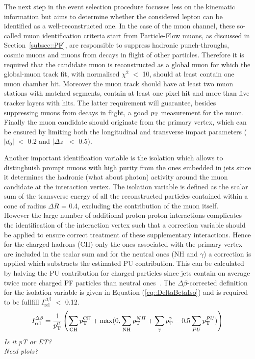 The next step in the event selection procedure focusses less on the kinematic information but aims to determine whether the considered lepton can be identified as a well-reconstructed one. 
In the case of the muon channel, these so-called muon identification criteria start from Particle-Flow muons, as discussed in Section~\ref{subsec::PF}, are responsible to suppress hadronic punch-throughs, cosmic muons and muons from decays in flight of other particles.
Therefore it is required that the candidate muon is reconstructed as a global muon for which the global-muon track fit, with normalised $\chi^{2}$ $<$ 10, should at least contain one muon chamber hit. 
Moreover the muon track should have at least two muon stations with matched segments, contain at least one pixel hit and more than five tracker layers with hits. The latter requirement will guarantee, besides suppressing muons from decays in flight, a good $p_{\rm T}$ measurement for the muon.
Finally the muon candidate should originate from the primary vertex, which can be ensured by limiting both the longitudinal and transverse impact parameters ($\vert d_0 \vert$ $<$ 0.2 and $\vert \Delta z \vert$ $<$ 0.5).

Another important identification variable is the isolation which allows to distinghuish prompt muons with high purity from the ones embedded in jets since it determines the hadronic (what about photon) activity around the muon candidate at the interaction vertex. %
The isolation variable is defined as the scalar sum of the transverse energy of all the reconstructed particles contained within a cone of radius $\Delta R$ = 0.4, excluding the contribution of the muon itself.
\\
However the large number of additional proton-proton interactions complicates the identification of the interaction vertex such that a correction variable should be applied to ensure correct treatment of these supplementary interactions. Hence for the charged hadrons (CH) only the ones associated with the primary vertex are included in the scalar sum and for the neutral ones (NH and $\gamma$) a correction is applied which substracts the estimated PU contribution. This can be calculated by halving the PU contribution for charged particles since jets contain on average twice more charged PF particles than neutral ones~\cite{CHContrVsN}.
The $\Delta \beta$-corrected definition for the isolation variable is given in Equation (\ref{eq::DeltaBetaIso}) and is required to be fullfill $I_{\textrm{rel}}^{\Delta \beta}$ $<$ 0.12.
\begin{equation}\label{eq::DeltaBetaIso}
 I_{\textrm{rel}}^{\Delta \beta} = \frac{1}{p_{\rm T}^{\mu}} \left( \sum_{\textrm{CH}} p_{\rm T}^{\textrm{CH}} + \max(0, \sum_{\textrm{NH}} p_{\rm T}^{NH} + \sum_{\gamma} p_{\rm T}^{\gamma} - 0.5 \sum_{PU} p_{\rm T}^{PU}) \right)
\end{equation}
\textit{Is it pT or ET?}\\
\textit{Need plots?}


